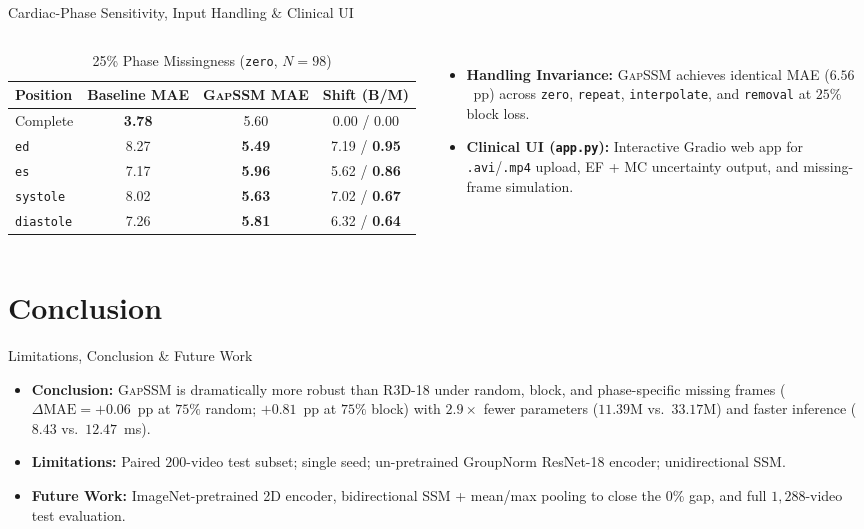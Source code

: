 \documentclass[aspectratio=169,11pt]{beamer}
\begin{document}
\begin{frame}{Cardiac-Phase Sensitivity, Input Handling & Clinical UI}
\begin{columns}
\begin{table}\centering\scriptsize
\caption{25\% Phase Missingness (\texttt{zero}, $N=98$)}
\begin{tabular}{lccc}\toprule
Position & Baseline MAE & \textsc{GapSSM} MAE & Shift (B/M) \\\midrule
Complete & \textbf{3.78} & 5.60 & 0.00 / 0.00 \\
\texttt{ed} & 8.27 & \textbf{5.49} & 7.19 / \textbf{0.95} \\
\texttt{es} & 7.17 & \textbf{5.96} & 5.62 / \textbf{0.86} \\
\texttt{systole} & 8.02 & \textbf{5.63} & 7.02 / \textbf{0.67} \\
\texttt{diastole} & 7.26 & \textbf{5.81} & 6.32 / \textbf{0.64} \\
\bottomrule
\end{tabular}
\end{table}
\begin{itemize}\small
    \item \textbf{Handling Invariance:} \textsc{GapSSM} achieves identical MAE ($6.56$~pp) across \texttt{zero}, \texttt{repeat}, \texttt{interpolate}, and \texttt{removal} at $25\%$ block loss.
    \item \textbf{Clinical UI (\texttt{app.py}):} Interactive Gradio web app for \texttt{.avi}/\texttt{.mp4} upload, EF + MC uncertainty output, and missing-frame simulation.
\end{itemize}
\end{columns}
\end{frame}

\section{Conclusion}
\begin{frame}{Limitations, Conclusion \& Future Work}
\begin{itemize}
    \item \textbf{Conclusion:} \textsc{GapSSM} is dramatically more robust than R3D-18 under random, block, and phase-specific missing frames ($\Delta\text{MAE}=+0.06$~pp at $75\%$ random; $+0.81$~pp at $75\%$ block) with $2.9\times$ fewer parameters ($11.39$M vs.\ $33.17$M) and faster inference ($8.43$ vs.\ $12.47$~ms).
    \item \textbf{Limitations:} Paired $200$-video test subset; single seed; un-pretrained GroupNorm ResNet-18 encoder; unidirectional SSM.
    \item \textbf{Future Work:} ImageNet-pretrained 2D encoder, bidirectional SSM + mean/max pooling to close the $0\%$ gap, and full $1,288$-video test evaluation.
\end{itemize}
\end{frame}
\end{document}
